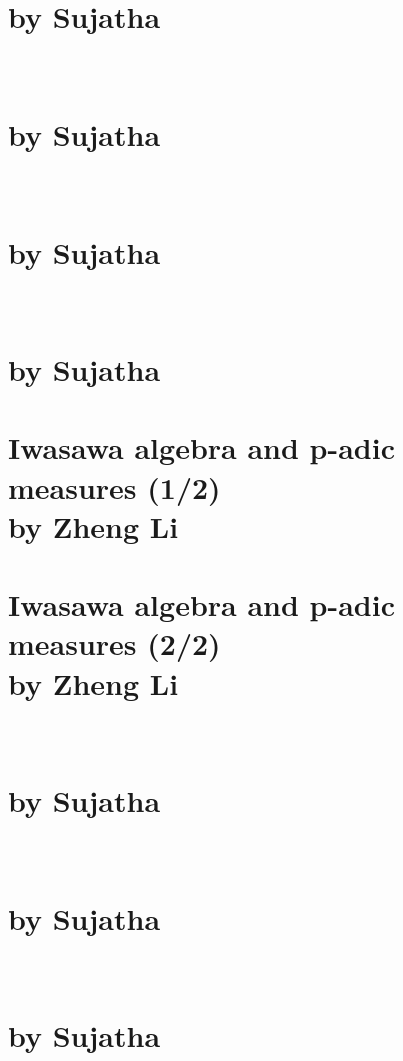\documentclass[12pt,amsfont]{amsart}
\begin{document}
\newpage
\section{\\ by Sujatha}\label{1}

\newpage
\section{\\ by Sujatha}\label{2}

\newpage
\section{\\ by Sujatha}\label{3}

\newpage
\section{\\ by Sujatha}\label{4}

\newpage
\section{Iwasawa algebra and p-adic measures (1/2)\\ by Zheng Li}\label{5}

\newpage
\section{Iwasawa algebra and p-adic measures (2/2)\\ by Zheng Li}\label{6}

\newpage
\section{\\ by Sujatha}\label{7}

\newpage
\section{ \\ by Sujatha}\label{8}

\newpage
\section{ \\ by Sujatha}\label{9}
\end{document}
